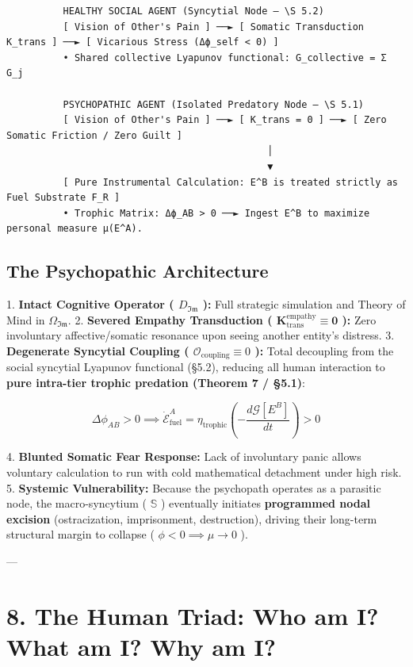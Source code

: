 \documentclass[11pt,a4paper]{article}
\theoremstyle{definition}
\theoremstyle{remark}
\begin{document}
\begin{verbatim}
          HEALTHY SOCIAL AGENT (Syncytial Node — \S 5.2)
          [ Vision of Other's Pain ] ──► [ Somatic Transduction K_trans ] ──► [ Vicarious Stress (Δϕ_self < 0) ]
          • Shared collective Lyapunov functional: G_collective = Σ G_j

          PSYCHOPATHIC AGENT (Isolated Predatory Node — \S 5.1)
          [ Vision of Other's Pain ] ──► [ K_trans = 0 ] ──► [ Zero Somatic Friction / Zero Guilt ]
                                              │
                                              ▼
          [ Pure Instrumental Calculation: E^B is treated strictly as Fuel Substrate F_R ]
          • Trophic Matrix: Δϕ_AB > 0 ──► Ingest E^B to maximize personal measure μ(E^A).
\end{verbatim}

\subsection{The Psychopathic Architecture}
1. \textbf{Intact Cognitive Operator ( $D_{\mathfrak{Im}}$ ):} Full strategic simulation and Theory of Mind in $\Omega_{\mathfrak{Im}}$.
2. \textbf{Severed Empathy Transduction ( $\mathbf{K}_{\text{trans}}^{\text{empathy}} \equiv \mathbf{0}$ ):} Zero involuntary affective/somatic resonance upon seeing another entity's distress.
3. \textbf{Degenerate Syncytial Coupling ( $\mathcal{O}_{\text{coupling}} \equiv 0$ ):} Total decoupling from the social syncytial Lyapunov functional (\S 5.2), reducing all human interaction to \textbf{pure intra-tier trophic predation (Theorem 7 / \S 5.1)}:


\begin{equation}
\Delta \phi_{AB} > 0 \implies \dot{\mathcal{E}}_{\text{fuel}}^A = \eta_{\text{trophic}} \left( -\frac{d\mathcal{G}[E^B]}{dt} \right) > 0
\end{equation}


4. \textbf{Blunted Somatic Fear Response:} Lack of involuntary panic allows voluntary calculation to run with cold mathematical detachment under high risk.
5. \textbf{Systemic Vulnerability:} Because the psychopath operates as a parasitic node, the macro-syncytium ( $\mathbb{S}$ ) eventually initiates \textbf{programmed nodal excision} (ostracization, imprisonment, destruction), driving their long-term structural margin to collapse ( $\phi < 0 \implies \mu \to 0$ ).

---

\section{8. The Human Triad: Who am I? What am I? Why am I?}
\end{document}
